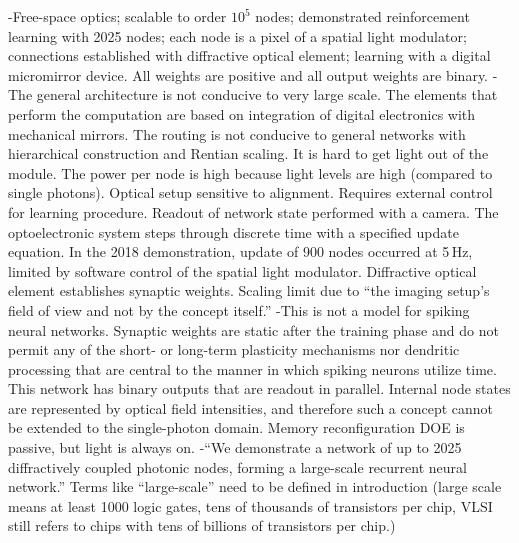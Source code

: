 \cite{buma2018}
-Free-space optics; scalable to order $10^5$ nodes; demonstrated reinforcement learning with 2025 nodes; each node is a pixel of a spatial light modulator; connections established with diffractive optical element; learning with a digital micromirror device. All weights are positive and all output weights are binary.
-The general architecture is not conducive to very large scale. The elements that perform the computation are based on integration of digital electronics with mechanical mirrors. The routing is not conducive to general networks with hierarchical construction and Rentian scaling. It is hard to get light out of the module. The power per node is high because light levels are high (compared to single photons). Optical setup sensitive to alignment. Requires external control for learning procedure. Readout of network state performed with a camera. The optoelectronic system steps through discrete time with a specified update equation. In the 2018 demonstration, update of 900 nodes occurred at 5\,Hz, limited by software control of the spatial light modulator. Diffractive optical element establishes synaptic weights. Scaling limit due to ``the imaging setup's field of view and not by the concept itself.''
-This is not a model for spiking neural networks. Synaptic weights are static after the training phase and do not permit any of the short- or long-term plasticity mechanisms nor dendritic processing that are central to the manner in which spiking neurons utilize time. This network has binary outputs that are readout in parallel. Internal node states are represented by optical field intensities, and therefore such a concept cannot be extended to the single-photon domain. Memory reconfiguration DOE is passive, but light is always on.
-``We demonstrate a network of up to 2025 diffractively coupled photonic nodes, forming a large-scale recurrent neural network.'' Terms like ``large-scale'' need to be defined in introduction (large scale means at least 1000 logic gates, tens of thousands of transistors per chip, VLSI still refers to chips with tens of billions of transistors per chip.)

